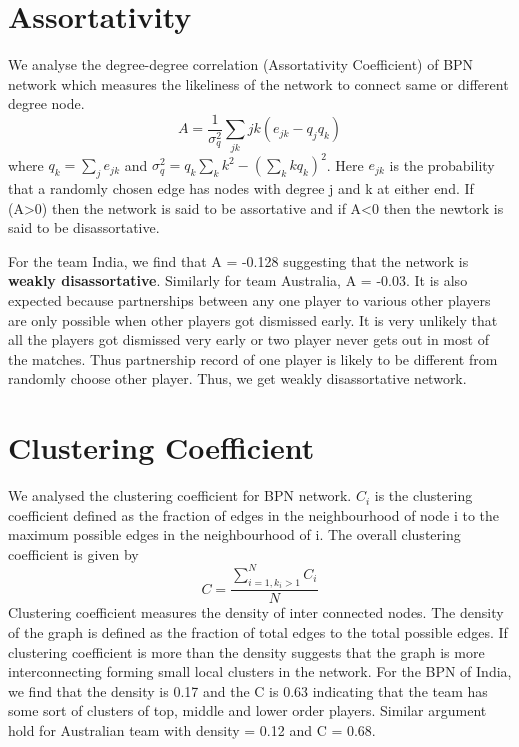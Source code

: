 \documentclass{article}
\begin{document}
\section{Assortativity}
We analyse the degree-degree correlation (Assortativity Coefficient) of BPN network which measures the likeliness of the network to connect same or different degree node. $$A = \frac{1}{\sigma_{q}^2}\sum_{jk}jk(e_{jk} - q_jq_k)$$ where $q_k = \sum_{j} e_{jk}$ and $\sigma_{q}^2 = q_k\sum_{k}k^2 - (\sum_{k}kq_{k})^2$. Here $e_{jk}$ is the probability that a randomly chosen edge has nodes with degree j and k at either end. If (A>0) then the network is said to be assortative and if A<0 then the newtork is said to be disassortative.

\begin{table}[!h]
\end{table}

For the team India, we find that A = -0.128 suggesting that the network is  \textbf{weakly disassortative}. Similarly for team Australia, A = -0.03. It is also expected because partnerships between any one player to various other players are only possible when other players got dismissed early. It is very unlikely that all the players got dismissed very early or two player never gets out in most of the matches. Thus partnership record of one player is likely to be different from randomly choose other player. Thus, we get weakly disassortative network.

\section{Clustering Coefficient}
We analysed the clustering coefficient for BPN network. $C_i$ is the clustering coefficient defined as the fraction of edges in the neighbourhood of node i to the maximum possible edges in the neighbourhood of i. The overall clustering coefficient is given by $$C = \frac{\sum_{i=1,k_i > 1}^N C_{i}}{N}$$ Clustering coefficient measures the density of inter connected nodes. The density of the graph is defined as the fraction of total edges to the total possible edges. If clustering coefficient is more than the density suggests that the graph is more interconnecting forming small local clusters in the network. For the BPN of India, we find that the density is 0.17 and the C is 0.63 indicating that the team has some sort of clusters of top, middle and lower order players. Similar argument hold for Australian team with density = 0.12 and C = 0.68.
\end{document}
